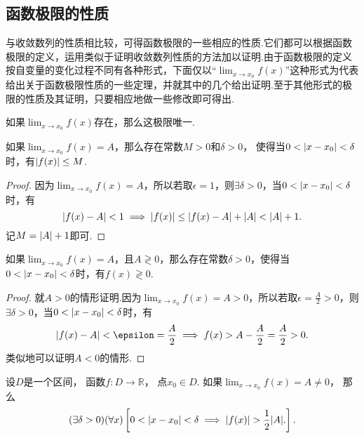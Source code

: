 \subsection{函数极限的性质}
与收敛数列的性质相比较，可得函数极限的一些相应的性质.它们都可以根据函数极限的定义，运用类似于证明收敛数列性质的方法加以证明.由于函数极限的定义按自变量的变化过程不同有各种形式，下面仅以“\(\lim_{x \to x_0}f(x)\)”这种形式为代表给出关于函数极限性质的一些定理，并就其中的几个给出证明.至于其他形式的极限的性质及其证明，只要相应地做一些修改即可得出.

\begin{theorem}[函数极限的唯一性]\label{theorem:极限.函数极限的唯一性}
如果\(\lim_{x \to x_0} f(x)\)存在，那么这极限唯一.
\end{theorem}

\begin{theorem}[函数极限的局部有界性]\label{theorem:极限.函数极限的局部有界性}
如果\(\lim_{x \to x_0}f(x) = A\)，那么存在常数\(M>0\)和\(\delta>0\)，
使得当\(0<\abs{x-x_0}<\delta\)时，有\(\abs{f(x)} \leq M\).
\begin{proof}
因为\(\lim_{x \to x_0}f(x) = A\)，所以若取\(\epsilon = 1\)，则\(\exists \delta > 0\)，当\(0 < \abs{x - x_0} < \delta\)时，有\[
\abs{f(x) - A} < 1 \implies \abs{f(x)} \leq \abs{f(x) - A} + \abs{A} < \abs{A} + 1.
\]记\(M = \abs{A} + 1\)即可.
\end{proof}
\end{theorem}

\begin{theorem}[函数极限的局部保号性]\label{theorem:极限.函数极限的局部保号性1}
如果\(\lim_{x \to x_0}f(x)=A\)，且\(A \gtrless 0\)，那么存在常数\(\delta>0\)，使得当\(0<\abs{x-x_0}<\delta\)时，有\(f(x) \gtrless 0\).
\begin{proof}
就\(A > 0\)的情形证明.因为\(\lim_{x \to x_0}f(x) = A > 0\)，所以若取\(\epsilon = \frac{A}{2} > 0\)，则\(\exists \delta > 0\)，当\(0 < \abs{x - x_0} < \delta\)时，有\[
\abs{f(x) - A} < \epsilon = \frac{A}{2}
\implies f(x) > A - \frac{A}{2} = \frac{A}{2} > 0.
\]类似地可以证明\(A < 0\)的情形.
\end{proof}
\end{theorem}

\begin{theorem}\label{theorem:极限.函数极限的局部保号性2}
设\(D\)是一个区间，
函数\(f\colon D\to\mathbb{R}\)，
点\(x_0 \in D\).
如果\(\lim_{x \to x_0} f(x) = A \neq 0\)，
那么\[
	(\exists \delta>0)
	(\forall x)
	\left[
		0<\abs{x-x_0}<\delta
		\implies
		\abs{f(x)}>\frac12\abs{A}.
	\right].
\]
\end{theorem}

